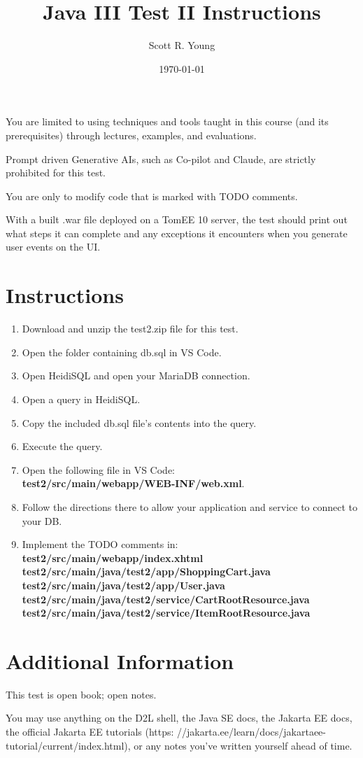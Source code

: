 \documentclass{article}
\title{Java III Test II Instructions}
\author{Scott R. Young}
\date{\today}
\begin{document}
\maketitle

You are limited to using techniques and tools taught in this course (and its
prerequisites) through lectures, examples, and evaluations.

Prompt driven Generative AIs, such as Co-pilot and Claude, are
strictly prohibited for this test.

You are only to modify code that is marked with TODO comments.

With a built .war file deployed on a TomEE 10 server, the test should print out
what steps it can complete and any exceptions it encounters when you generate
user events on the UI.

\section{Instructions}
\begin{enumerate}
    \item Download and unzip the test2.zip file for this test.
    \item Open the folder containing db.sql in VS Code.
    \item Open HeidiSQL and open your MariaDB connection.
    \item Open a query in HeidiSQL.
    \item Copy the included db.sql file's contents into the query.
    \item Execute the query.
    \item Open the following file in VS Code: \\
            \textbf{test2/src/main/webapp/WEB-INF/web.xml}.
    \item Follow the directions there to allow your application and service to connect to your DB.
    \item Implement the TODO comments in:\\
            \textbf{test2/src/main/webapp/index.xhtml}\\
            \textbf{test2/src/main/java/test2/app/ShoppingCart.java}\\
            \textbf{test2/src/main/java/test2/app/User.java}\\
            \textbf{test2/src/main/java/test2/service/CartRootResource.java}\\
            \textbf{test2/src/main/java/test2/service/ItemRootResource.java}
\end{enumerate}

\section{Additional Information}
This test is open book; open notes.

You may use anything on the D2L shell, the Java SE docs, the Jakarta EE docs, the official Jakarta EE tutorials (https:
//jakarta.ee/learn/docs/jakartaee-tutorial/current/index.html), or any notes you've written yourself ahead of time.
\end{document}
